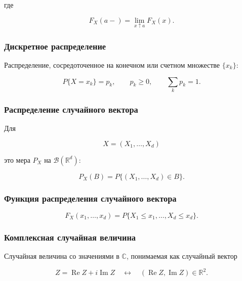 \documentclass[
  11pt,
  a4paper,
]{article}
\begin{document}
где

\[
F_X(a-)=\lim_{x\uparrow a}F_X(x).
\]

\subsubsection{Дискретное
распределение}\label{ux434ux438ux441ux43aux440ux435ux442ux43dux43eux435-ux440ux430ux441ux43fux440ux435ux434ux435ux43bux435ux43dux438ux435}

Распределение, сосредоточенное на конечном или счетном множестве
\(\{x_k\}\):

\[
P\{X=x_k\}=p_k,\qquad p_k\ge0,\qquad \sum_k p_k=1.
\]

\subsubsection{Распределение случайного
вектора}\label{ux440ux430ux441ux43fux440ux435ux434ux435ux43bux435ux43dux438ux435-ux441ux43bux443ux447ux430ux439ux43dux43eux433ux43e-ux432ux435ux43aux442ux43eux440ux430}

Для

\[
X=(X_1,\ldots,X_d)
\]

это мера \(P_X\) на \(\mathcal B(\mathbb R^d)\):

\[
P_X(B)=P\{(X_1,\ldots,X_d)\in B\}.
\]

\subsubsection{Функция распределения случайного
вектора}\label{ux444ux443ux43dux43aux446ux438ux44f-ux440ux430ux441ux43fux440ux435ux434ux435ux43bux435ux43dux438ux44f-ux441ux43bux443ux447ux430ux439ux43dux43eux433ux43e-ux432ux435ux43aux442ux43eux440ux430}

\[
F_X(x_1,\ldots,x_d)
=
P\{X_1\le x_1,\ldots,X_d\le x_d\}.
\]

\subsubsection{Комплексная случайная
величина}\label{ux43aux43eux43cux43fux43bux435ux43aux441ux43dux430ux44f-ux441ux43bux443ux447ux430ux439ux43dux430ux44f-ux432ux435ux43bux438ux447ux438ux43dux430}

Случайная величина со значениями в \(\mathbb C\), понимаемая как
случайный вектор

\[
Z=\operatorname{Re}Z+i\operatorname{Im}Z
\quad\leftrightarrow\quad
(\operatorname{Re}Z,\operatorname{Im}Z)\in\mathbb R^2.
\]
\end{document}
